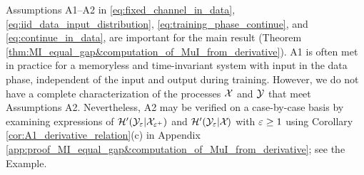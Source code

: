 \documentclass[12pt, draftclsnofoot,journal,onecolumn]{IEEEtran}
\begin{document}

Assumptions A1--A2 in \eqref{eq:fixed_channel_in_data}, \eqref{eq:iid_data_input_distribution},  \eqref{eq:training_phase_continue}, and  \eqref{eq:continue_in_data},  are important for the main result (Theorem \ref{thm:MI_equal_gap&computation_of_MuI_from_derivative}). 
A1 is often met in practice for a memoryless and time-invariant system with \iid input in the data phase, independent of the input and output during training. However, we do not have a complete characterization of the processes $\mathcal{X}$ and $\mathcal{Y}$ that meet Assumptions A2.  Nevertheless, A2 may be verified on a case-by-case basis by examining expressions of  ${\mathcal{H}{'}}({\mathcal{Y}}_{\varepsilon}|{\mathcal{X}}_{\varepsilon^+})$ and ${\mathcal{H}{'}}({\mathcal{Y}}_{\varepsilon}|{\mathcal{X}}_{})$ with $\varepsilon\geq 1$ using Corollary \ref{cor:A1_derivative_relation}(c) in Appendix \ref{app:proof_MI_equal_gap&computation_of_MuI_from_derivative}; see the Example.



\end{document}
